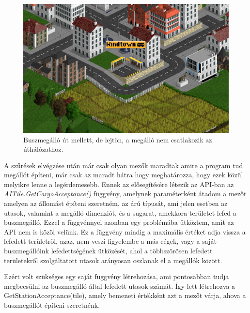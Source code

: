 \begin{figure}
	\centering
	\includegraphics[scale=0.8]{images/lejtomegallo.png}
	\caption{Buszmegálló út mellett, de lejtőn, a megálló nem csatlakozik az úthálózathoz.}
	\label{fig:lejtomegallo}
\end{figure}

A szűrések elvégzése után már csak olyan mezők maradtak amire a program tud megállót építeni, már csak az maradt hátra hogy meghatározza, hogy ezek közül melyikre lenne a legérdemesebb. Ennek az elősegítésére létezik az API-ban az \textit{AITile.GetCargoAcceptance()} függvény, amelynek paraméterként átadom a mezőt amelyen az állomást építeni szeretném, az árú típusát, ami jelen esetben az utasok, valamint a megálló dimenziót, és a sugarat, amekkora területet lefed a buszmegálló. Ezzel a függvénnyel azonban egy problémába ütköztem, amit az API nem is közöl velünk. Ez a függvény mindig a maximális értéket adja vissza a lefedett területről, azaz, nem veszi figyelembe a más cégek, vagy a saját buszmegállóink lefedettségének ütközését, ahol a többszörösen lefedett területekről szolgáltatott utasok arányosan oszlanak el a megállók között.

Ezért volt szükséges egy saját függvény létrehozása, ami pontosabban tudja megbecsülni az buszmegálló által lefedett utasok számát. Így lett létrehozva a GetStationAcceptance(tile), amely bemeneti értékként azt a mezőt várja, ahova a buszmegállót építeni szeretnénk.

